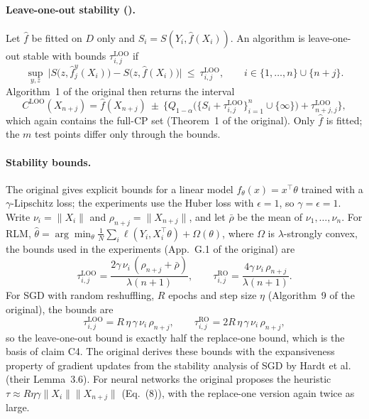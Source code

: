 \paragraph{Leave-one-out stability (\LOO).} Let $\hat f$ be fitted on $D$ only and $S_i=S(Y_i,\hat f(X_i))$. An
algorithm is leave-one-out stable with bounds $\tau^{\mathrm{LOO}}_{i,j}$ if
\begin{equation}
  \sup_{y,z}\ \big|S\big(z,\hat f_j^{y}(X_i)\big)-S\big(z,\hat f(X_i)\big)\big|\ \le\ \tau^{\mathrm{LOO}}_{i,j},
  \qquad i\in\{1,\dots,n\}\cup\{n+j\}.
\end{equation}
Algorithm~1 of the original then returns the interval
\begin{equation}
  C^{\mathrm{LOO}}(X_{n+j})=\hat f(X_{n+j})\ \pm\ \Big\{Q_{1-\alpha}\big(\{S_i+\tau^{\mathrm{LOO}}_{i,j}\}_{i=1}^n
  \cup\{\infty\}\big)+\tau^{\mathrm{LOO}}_{n+j,j}\Big\},
  \label{eq:loo}
\end{equation}
which again contains the full-CP set (Theorem~1 of the original). Only $\hat f$ is fitted; the $m$ test points differ
only through the bounds.

\paragraph{Stability bounds.} The original gives explicit bounds for a linear model $f_\theta(x)=x^\top\theta$
trained with a $\gamma$-Lipschitz loss; the experiments use the Huber loss with $\epsilon=1$, so $\gamma=\epsilon=1$.
Write $\nu_i=\|X_i\|$ and $\rho_{n+j}=\|X_{n+j}\|$, and let $\bar\rho$ be the mean of $\nu_1,\dots,\nu_n$. For RLM,
$\hat\theta=\arg\min_\theta \tfrac{1}{N}\sum_i \ell(Y_i,X_i^\top\theta)+\Omega(\theta)$, where $\Omega$ is
$\lambda$-strongly convex, the bounds used in the experiments (App.~G.1 of the original) are
\begin{equation}
  \tau^{\mathrm{LOO}}_{i,j}=\frac{2\gamma\,\nu_i\,(\rho_{n+j}+\bar\rho)}{\lambda(n+1)},\qquad
  \tau^{\mathrm{RO}}_{i,j}=\frac{4\gamma\,\nu_i\,\rho_{n+j}}{\lambda(n+1)} .
  \label{eq:rlmbound}
\end{equation}
For SGD with random reshuffling, $R$ epochs and step size $\eta$ (Algorithm~9 of the original), the bounds are
\begin{equation}
  \tau^{\mathrm{LOO}}_{i,j}=R\,\eta\,\gamma\,\nu_i\,\rho_{n+j},\qquad
  \tau^{\mathrm{RO}}_{i,j}=2R\,\eta\,\gamma\,\nu_i\,\rho_{n+j},
  \label{eq:sgdbound}
\end{equation}
so the leave-one-out bound is exactly half the replace-one bound, which is the basis of claim C4. The original
derives these bounds with the expansiveness property of gradient updates from the stability analysis of SGD by Hardt
et al.\supercite{hardt2016train} (their Lemma~3.6). For neural networks the original proposes the
heuristic $\tau\approx R\eta\gamma\|X_i\|\|X_{n+j}\|$ (Eq.~(8)), with the replace-one version again twice as large.


